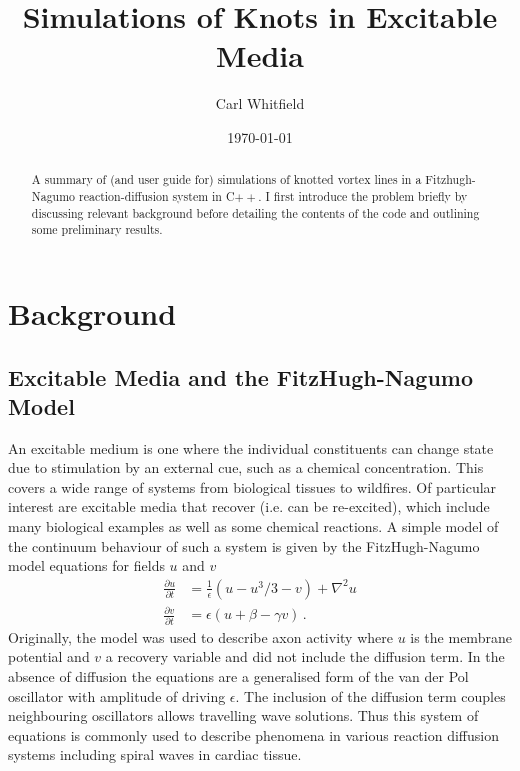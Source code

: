 \documentclass[notitlepage,aps,amsmath,amssymb,11pt]{revtex4-1}
\newcommand{\pdiff}[2]{\frac{\partial#1}{\partial#2}}
\begin{document}
\title{Simulations of Knots in Excitable Media}
\author{Carl Whitfield}
\date{\today}
\begin{abstract}
A summary of (and user guide for) simulations of knotted vortex lines in a Fitzhugh-Nagumo reaction-diffusion system in C$++$. I first introduce the problem briefly by discussing relevant background before detailing the contents of the code and outlining some preliminary results.
\end{abstract}
\maketitle
\tableofcontents

\section{Background}

\subsection{Excitable Media and the FitzHugh-Nagumo Model}

An excitable medium is one where the individual constituents can change state due to stimulation by an external cue, such as a chemical concentration. This covers a wide range of systems from biological tissues to wildfires. Of particular interest are excitable media that recover (i.e. can be re-excited), which include many biological examples as well as some chemical reactions. A simple model of the continuum behaviour of such a system is given by the FitzHugh-Nagumo model equations for fields $u$ and $v$
\begin{align}
\label{dudt} \pdiff{u}{t} &= \frac{1}{\epsilon}( u - u^3/3 - v) + \nabla^2 u\\
\label{dvdt} \pdiff{v}{t} &= \epsilon(u + \beta - \gamma v) \, . 
\end{align}
Originally, the model was used to describe axon activity where $u$ is the membrane potential and $v$ a recovery variable \cite{FitzHugh1955, Nagumo1962} and did not include the diffusion term. In the absence of diffusion the equations are a generalised form of the van der Pol oscillator with amplitude of driving $\epsilon$. The inclusion of the diffusion term couples neighbouring oscillators allows travelling wave solutions. Thus this system of equations is commonly used to describe phenomena in various reaction diffusion systems including spiral waves in cardiac tissue. 
\end{document}

